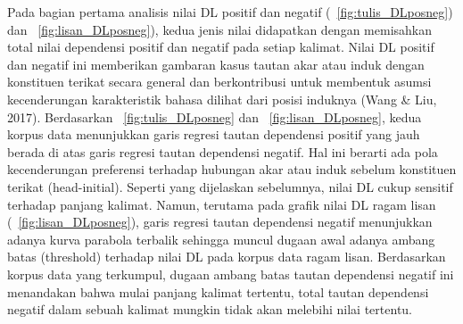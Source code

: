 Pada bagian pertama analisis nilai DL positif dan negatif (\pic~\ref{fig:tulis_DLposneg}) dan \pic~\ref{fig:lisan_DLposneg}), kedua jenis nilai didapatkan dengan memisahkan total nilai dependensi positif dan negatif pada setiap kalimat. Nilai DL positif dan negatif ini memberikan gambaran kasus tautan akar atau induk dengan konstituen terikat secara general dan berkontribusi untuk membentuk asumsi kecenderungan karakteristik bahasa dilihat dari posisi induknya (Wang & Liu, 2017). Berdasarkan \pic~\ref{fig:tulis_DLposneg} dan \pic~\ref{fig:lisan_DLposneg}, kedua korpus data menunjukkan garis regresi tautan dependensi positif yang jauh berada di atas garis regresi tautan dependensi negatif. Hal ini berarti ada pola kecenderungan preferensi terhadap hubungan akar atau induk sebelum konstituen terikat (head-initial). Seperti yang dijelaskan sebelumnya, nilai DL cukup sensitif terhadap panjang kalimat. Namun, terutama pada grafik nilai DL ragam lisan (\pic~\ref{fig:lisan_DLposneg}), garis regresi tautan dependensi negatif menunjukkan adanya kurva parabola terbalik sehingga muncul dugaan awal adanya ambang batas (threshold) terhadap nilai DL pada korpus data ragam lisan. Berdasarkan korpus data yang terkumpul, dugaan ambang batas tautan dependensi negatif ini menandakan bahwa mulai panjang kalimat tertentu, total tautan dependensi negatif dalam sebuah kalimat mungkin tidak akan melebihi nilai tertentu. 

